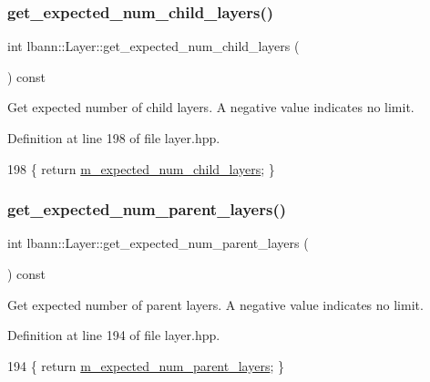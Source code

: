 \subsubsection{\texorpdfstring{get\+\_\+expected\+\_\+num\+\_\+child\+\_\+layers()}{get\_expected\_num\_child\_layers()}}
{\footnotesize\ttfamily int lbann\+::\+Layer\+::get\+\_\+expected\+\_\+num\+\_\+child\+\_\+layers (\begin{DoxyParamCaption}{ }\end{DoxyParamCaption}) const\hspace{0.3cm}{\ttfamily [inline]}}

Get expected number of child layers. A negative value indicates no limit. 

Definition at line 198 of file layer.\+hpp.


\begin{DoxyCode}
198 \{ \textcolor{keywordflow}{return} \hyperlink{classlbann_1_1Layer_ac08f133dddd150319650e220ab9a523a}{m\_expected\_num\_child\_layers}; \}
\end{DoxyCode}
\mbox{\label{classlbann_1_1Layer_aa30dbf20929aaa58b5be98b98217ca88}} 
\subsubsection{\texorpdfstring{get\+\_\+expected\+\_\+num\+\_\+parent\+\_\+layers()}{get\_expected\_num\_parent\_layers()}}
{\footnotesize\ttfamily int lbann\+::\+Layer\+::get\+\_\+expected\+\_\+num\+\_\+parent\+\_\+layers (\begin{DoxyParamCaption}{ }\end{DoxyParamCaption}) const\hspace{0.3cm}{\ttfamily [inline]}}

Get expected number of parent layers. A negative value indicates no limit. 

Definition at line 194 of file layer.\+hpp.


\begin{DoxyCode}
194 \{ \textcolor{keywordflow}{return} \hyperlink{classlbann_1_1Layer_a841b96b25555247f52921c7f13ae1dfa}{m\_expected\_num\_parent\_layers}; \}
\end{DoxyCode}
\mbox{\label{classlbann_1_1Layer_ac6b43c63399f717cc1a4a0a2007350f2}} 
